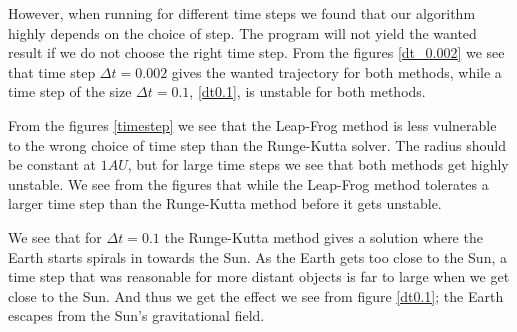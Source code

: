 \documentclass[a4paper,12pt, english]{article}
\begin{document}
However, when running for different time steps we found that our algorithm highly depends on the choice of step. The program will not yield the wanted result if we do not choose the right time step. From the figures \ref{dt_0.002} we see that time step $\Delta t = 0.002$ gives the wanted trajectory for both methods, while a time step of the size $\Delta t = 0.1$, \ref{dt0.1}, is unstable for both methods. 

From the figures \ref{timestep} we see that the Leap-Frog method is less vulnerable to the wrong choice of time step than the Runge-Kutta solver. The radius should be constant at $1 AU$, but for large time steps we see that both methods get highly unstable. We see from the figures that while the Leap-Frog method tolerates a larger time step than the Runge-Kutta method before it gets unstable. 


We see that for $\Delta t = 0.1$ the Runge-Kutta method gives a solution where the Earth starts spirals in towards the Sun. As the Earth gets too close to the Sun, a time step that was reasonable for more distant objects is far to large when we get close to the Sun. And thus we get the effect we see from figure \ref{dt0.1}; the Earth escapes from the Sun's  gravitational field. 
\end{document}
